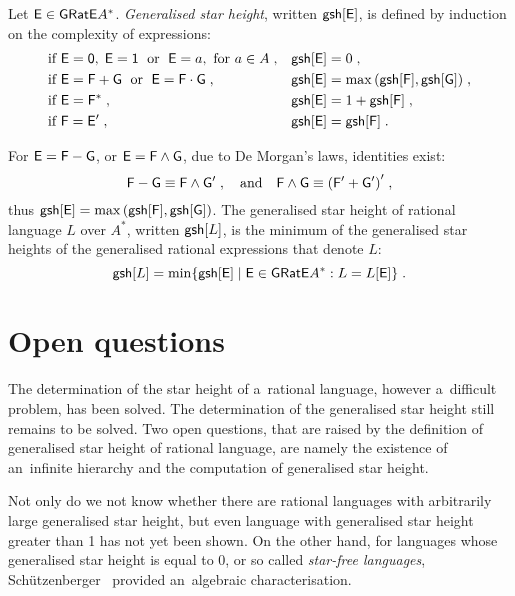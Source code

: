 \begin{defn}
    Let ${\mathsf{E}} \in {\mathsf{GRatE}} A^*$. \emph{Generalised star height}, written ${\mathsf{gs h}[{\mathsf{E}}]}$, is defined by induction on the complexity of expressions:
    \begin{align*}
        &\text{if } {\mathsf{E}} = {\mathsf{0}}, \; {\mathsf{E}} = {\mathsf{1}} \; \text{ or } \; {\mathsf{E}} = a, \text{ for } a \in A \; , & &{\mathsf{gs h}[{\mathsf{E}}]} = 0 \; , \\
        &\text{if } {\mathsf{E}} = {\mathsf{F}} + {\mathsf{G}} \; \text{ or } \; {\mathsf{E}} = {\mathsf{F}} \cdot {\mathsf{G}}\; , & &{\mathsf{gs h}[{\mathsf{E}}]} = \max{({\mathsf{gs h}[{\mathsf{F}}]}, {\mathsf{gs h}[{\mathsf{G}}]})} \; , \\
        &\text{if } {\mathsf{E}} = {\mathsf{F}}^* \; , & &{\mathsf{gs h}[{\mathsf{E}}]} = 1 + {\mathsf{gs h}[{\mathsf{F}}]} \; , \\
        &\text{if } {\mathsf{F}} = {\mathsf{E}}^{\prime} \; , & &{\mathsf{gs h}[{\mathsf{E}}]} = {\mathsf{gs h}[{\mathsf{F}}]} \; .
    \end{align*}
\end{defn}
For ${\mathsf{E}} = {\mathsf{F}} - {\mathsf{G}}$, or ${\mathsf{E}} = {\mathsf{F}} \wedge {\mathsf{G}}$, due to De Morgan's laws, identities exist:
\[
    {\mathsf{F}} - {\mathsf{G}} \equiv {\mathsf{F}} \wedge {\mathsf{G}}^{\prime} \; , \quad \text{and} \quad {\mathsf{F}} \wedge {\mathsf{G}} \equiv {({\mathsf{F}}^{\prime} + {\mathsf{G}}^{\prime})}^{\prime} \; ,
\]
thus ${\mathsf{gs h}[{\mathsf{E}}]} = \max{({\mathsf{gs h}[{\mathsf{F}}]}, {\mathsf{gs h}[{\mathsf{G}}]})}$. The generalised star height of rational language $L$ over $A^*$, written ${\mathsf{gs h}[L]}$, is the minimum of the generalised star heights of the generalised rational expressions that denote $L$:
\[
    {\mathsf{gs h}[L]} = \min \{ {\mathsf{gs h}[{\mathsf{E}}]} \mid {\mathsf{E}} \in {\mathsf{GRatE}} A^*: L = L[{\mathsf{E}}] \} \; .
\]

\section{Open questions}

The determination of the star height of a~rational language, however a~difficult problem, has been solved. The determination of the generalised star height still remains to be solved. Two open questions, that are raised by the definition of generalised star height of rational language, are namely the existence of an~infinite hierarchy and the computation of generalised star height.

Not only do we not know whether there are rational languages with arbitrarily large generalised star height, but even language with generalised star height greater than 1 has not yet been shown. On the other hand, for languages whose generalised star height is equal to 0, or so called \emph{star-free languages}, Schützenberger~\cite{Schutzenberger65} provided an~algebraic characterisation.
